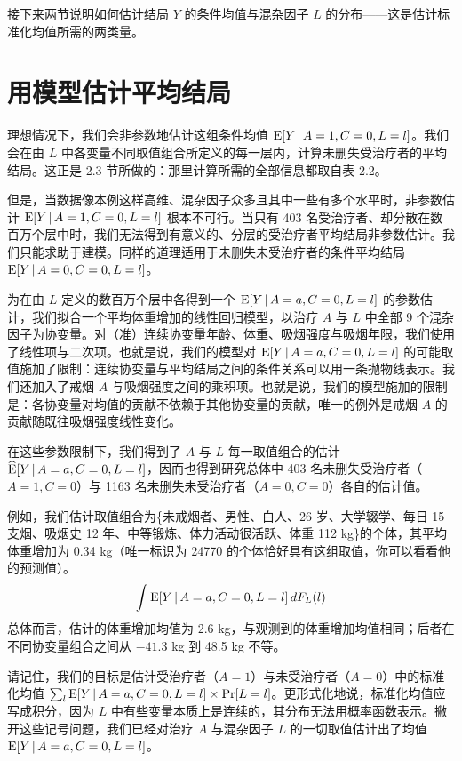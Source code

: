 接下来两节说明如何估计结局 $Y$ 的条件均值与混杂因子 $L$ 的分布——这是估计标准化均值所需的两类量。

\section{用模型估计平均结局}

理想情况下，我们会非参数地估计这组条件均值 $\mathrm{E}[Y\,|\, A=1,C=0,L=l]$。我们会在由 $L$ 中各变量不同取值组合所定义的每一层内，计算未删失受治疗者的平均结局。这正是 2.3 节所做的：那里计算所需的全部信息都取自表 2.2。

但是，当数据像本例这样高维、混杂因子众多且其中一些有多个水平时，非参数估计 $\mathrm{E}[Y\,|\, A=1,C=0,L=l]$ 根本不可行。当只有 403 名受治疗者、却分散在数百万个层中时，我们无法得到有意义的、分层的受治疗者平均结局非参数估计。我们只能求助于建模。同样的道理适用于未删失未受治疗者的条件平均结局 $\mathrm{E}[Y\,|\, A=0,C=0,L=l]$。

为在由 $L$ 定义的数百万个层中各得到一个 $\mathrm{E}[Y\,|\, A=a,C=0,L=l]$ 的参数估计，我们拟合一个平均体重增加的线性回归模型，以治疗 $A$ 与 $L$ 中全部 9 个混杂因子为协变量。对（准）连续协变量年龄、体重、吸烟强度与吸烟年限，我们使用了线性项与二次项。也就是说，我们的模型对 $\mathrm{E}[Y\,|\, A=a,C=0,L=l]$ 的可能取值施加了限制：连续协变量与平均结局之间的条件关系可以用一条抛物线表示。我们还加入了戒烟 $A$ 与吸烟强度之间的乘积项。也就是说，我们的模型施加的限制是：各协变量对均值的贡献不依赖于其他协变量的贡献，唯一的例外是戒烟 $A$ 的贡献随既往吸烟强度线性变化。

在这些参数限制下，我们得到了 $A$ 与 $L$ 每一取值组合的估计 $\widehat{\mathrm{E}}[Y\,|\, A=a,C=0,L=l]$，因而也得到研究总体中 403 名未删失受治疗者（$A=1,C=0$）与 1163 名未删失未受治疗者（$A=0,C=0$）各自的估计值。

例如，我们估计取值组合为\{未戒烟者、男性、白人、26 岁、大学辍学、每日 15 支烟、吸烟史 12 年、中等锻炼、体力活动很活跃、体重 112 kg\}的个体，其平均体重增加为 0.34 kg（唯一标识为 24770 的个体恰好具有这组取值，你可以看看他的预测值）。
\[
\int \mathrm{E}[Y\,|\, A=a,C=0,L=l]\,dF_L(l)
\]
总体而言，估计的体重增加均值为 2.6 kg，与观测到的体重增加均值相同；后者在不同协变量组合之间从 $-41.3$ kg 到 48.5 kg 不等。

请记住，我们的目标是估计受治疗者（$A=1$）与未受治疗者（$A=0$）中的标准化均值 $\sum_l \mathrm{E}[Y\,|\, A=a,C=0,L=l]\times\Pr[L=l]$。更形式化地说，标准化均值应写成积分，因为 $L$ 中有些变量本质上是连续的，其分布无法用概率函数表示。撇开这些记号问题，我们已经对治疗 $A$ 与混杂因子 $L$ 的一切取值估计出了均值 $\mathrm{E}[Y\,|\, A=a,C=0,L=l]$。

